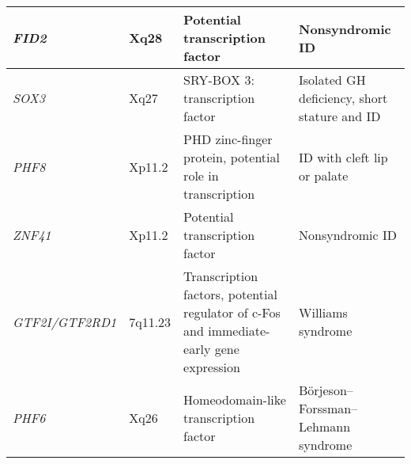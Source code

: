 {\begin{landscape}
\begin{spacing}{0.7}
\begin{longtable}{p{1in} p{1in} p{4.25in} p{2.75in}}
	\textit{FID2} & Xq28 & Potential transcription factor & Nonsyndromic ID \\ \midrule
	\textit{SOX3} & Xq27 & SRY-BOX 3: transcription factor & Isolated GH deficiency, short stature and ID \\ \midrule
	\textit{PHF8} & Xp11.2 & PHD zinc-finger protein, potential role in transcription & ID with cleft lip or palate \\ \midrule
	\textit{ZNF41} & Xp11.2 & Potential transcription factor & Nonsyndromic ID \\ \midrule
	\textit{GTF2I/GTF2RD1} & 7q11.23 & Transcription factors, potential regulator of c-Fos and immediate-early gene expression & Williams syndrome \\ \midrule
	\textit{PHF6} & Xq26 & Homeodomain-like transcription factor & Börjeson–Forssman–Lehmann syndrome \\ \midrule
    

\end{longtable}
\end{spacing}
\end{landscape}}
